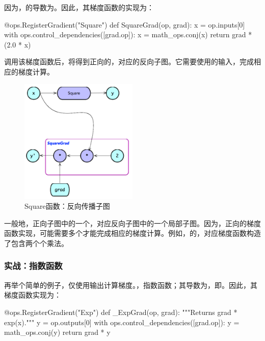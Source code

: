 \begin{content}
因为，的导数为。因此，其梯度函数的实现为：

\begin{leftbar}
\begin{python}
@ops.RegisterGradient("Square")
def SquareGrad(op, grad):
  x = op.inputs[0]
  with ops.control_dependencies([grad.op]):
    x = math_ops.conj(x)
    return grad * (2.0 * x)
\end{python}
\end{leftbar}

调用该梯度函数后，将得到正向的，对应的反向子图。它需要使用的输入，完成相应的梯度计算。

\begin{figure}[!h]
\centering
\includegraphics[width=0.5\textwidth]{figures/bp-square-backward-graph-2.png}
\caption{Square函数：反向传播子图}
 \label{fig:bp-square-backward-graph-2}
\end{figure}

一般地，正向子图中的一个，对应反向子图中的一个局部子图。因为，正向的梯度函数实现，可能需要多个才能完成相应的梯度计算。例如，的，对应梯度函数构造了包含两个个乘法。

\subsubsection{实战：指数函数}

再举个简单的例子，仅使用输出计算梯度。，指数函数；其导数为，即。因此，其梯度函数实现为：

\begin{leftbar}
\begin{python}
@ops.RegisterGradient("Exp")
def _ExpGrad(op, grad):
  """Returns grad * exp(x)."""
  y = op.outputs[0]
  with ops.control_dependencies([grad.op]):
    y = math_ops.conj(y)
    return grad * y
\end{python}
\end{leftbar}


\end{content}
